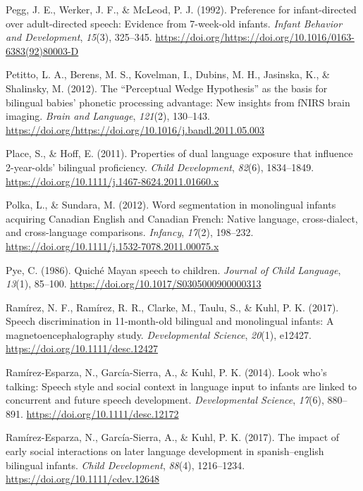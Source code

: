 \documentclass[,man,floatsintext]{apa6}
\begin{document}
\leavevmode\hypertarget{ref-pegg_1992}{}%
Pegg, J. E., Werker, J. F., \& McLeod, P. J. (1992). Preference for infant-directed over adult-directed speech: Evidence from 7-week-old infants. \emph{Infant Behavior and Development}, \emph{15}(3), 325--345. \url{https://doi.org/https://doi.org/10.1016/0163-6383(92)80003-D}

\leavevmode\hypertarget{ref-petitto_2012}{}%
Petitto, L. A., Berens, M. S., Kovelman, I., Dubins, M. H., Jasinska, K., \& Shalinsky, M. (2012). The ``Perceptual Wedge Hypothesis'' as the basis for bilingual babies' phonetic processing advantage: New insights from fNIRS brain imaging. \emph{Brain and Language}, \emph{121}(2), 130--143. \url{https://doi.org/https://doi.org/10.1016/j.bandl.2011.05.003}

\leavevmode\hypertarget{ref-place_2011}{}%
Place, S., \& Hoff, E. (2011). Properties of dual language exposure that influence 2-year-olds' bilingual proficiency. \emph{Child Development}, \emph{82}(6), 1834--1849. \url{https://doi.org/10.1111/j.1467-8624.2011.01660.x}

\leavevmode\hypertarget{ref-polka_2012}{}%
Polka, L., \& Sundara, M. (2012). Word segmentation in monolingual infants acquiring Canadian English and Canadian French: Native language, cross-dialect, and cross-language comparisons. \emph{Infancy}, \emph{17}(2), 198--232. \url{https://doi.org/10.1111/j.1532-7078.2011.00075.x}

\leavevmode\hypertarget{ref-pye_1986}{}%
Pye, C. (1986). Quiché Mayan speech to children. \emph{Journal of Child Language}, \emph{13}(1), 85--100. \url{https://doi.org/10.1017/S0305000900000313}

\leavevmode\hypertarget{ref-ramirez_2017}{}%
Ramírez, N. F., Ramírez, R. R., Clarke, M., Taulu, S., \& Kuhl, P. K. (2017). Speech discrimination in 11-month-old bilingual and monolingual infants: A magnetoencephalography study. \emph{Developmental Science}, \emph{20}(1), e12427. \url{https://doi.org/10.1111/desc.12427}

\leavevmode\hypertarget{ref-ramirez_esparza_2014}{}%
Ramírez-Esparza, N., García-Sierra, A., \& Kuhl, P. K. (2014). Look who's talking: Speech style and social context in language input to infants are linked to concurrent and future speech development. \emph{Developmental Science}, \emph{17}(6), 880--891. \url{https://doi.org/10.1111/desc.12172}

\leavevmode\hypertarget{ref-ramirez_esparza_2017}{}%
Ramírez-Esparza, N., García-Sierra, A., \& Kuhl, P. K. (2017). The impact of early social interactions on later language development in spanish--english bilingual infants. \emph{Child Development}, \emph{88}(4), 1216--1234. \url{https://doi.org/10.1111/cdev.12648}
\end{document}

